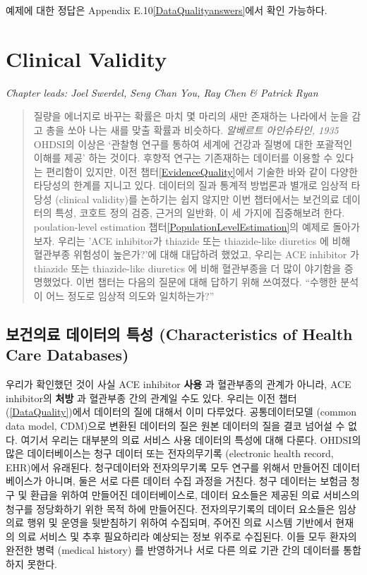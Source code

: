 \documentclass[11pt]{book}
\theoremstyle{definition}
\theoremstyle{definition}
\theoremstyle{definition}
\theoremstyle{remark}
\begin{document}
예제에 대한 정답은 Appendix E.10\ref{DataQualityanswers}에서 확인
가능하다.

\chapter{Clinical Validity}\label{ClinicalValidity}

\emph{Chapter leads: Joel Swerdel, Seng Chan You, Ray Chen \& Patrick
Ryan}

\begin{quote}
질량을 에너지로 바꾸는 확률은 마치 몇 마리의 새만 존재하는 나라에서 눈을
감고 총을 쏘아 나는 새를 맞출 확률과 비슷하다. \emph{알베르트
아인슈타인, 1935} OHDSI의 이상은 `관찰형 연구를 통하여 세계에 건강과
질병에 대한 포괄적인 이해를 제공' 하는 것이다. 후향적 연구는 기존재하는
데이터를 이용할 수 있다는 편리함이 있지만, 이전
챕터\ref{EvidenceQuality}에서 기술한 바와 같이 다양한 타당성의 한계를
지니고 있다. 데이터의 질과 통계적 방법론과 별개로 임상적 타당성
(clinical validity)를 논하기는 쉽지 않지만 이번 챕터에서는 보건의료
데이터의 특성, 코호트 정의 검증, 근거의 일반화, 이 세 가지에 집중해보려
한다. poulation-level estimation 챕터\ref{PopulationLevelEstimation}의
예제로 돌아가보자. 우리는 'ACE inhibitor가 thiazide 또는 thiazide-like
diuretics 에 비해 혈관부종 위험성이 높은가?'에 대해 대답하려 했었고,
우리는 ACE inhibitor 가 thiazide 또는 thiazide-like diuretics 에 비해
혈관부종을 더 많이 야기함을 증명했었다. 이번 챕터는 다음의 질문에 대해
답하기 위해 쓰여졌다. ``수행한 분석이 어느 정도로 임상적 의도와
일치하는가?'' 
\end{quote}

\section{보건의료 데이터의 특성 (Characteristics of Health Care
Databases)}\label{CharacteristicsOfDatabase}

우리가 확인했던 것이 사실 ACE inhibitor \textbf{사용} 과 혈관부종의
관계가 아니라, ACE inhibitor의 \textbf{처방} 과 혈관부종 간의 관계일
수도 있다. 우리는 이전 챕터(\ref{DataQuality})에서 데이터의 질에 대해서
이미 다루었다. 공통데이터모델 (common data model, CDM)으로 변환된
데이터의 질은 원본 데이터의 질을 결코 넘어설 수 없다. 여기서 우리는
대부분의 의료 서비스 사용 데이터의 특성에 대해 다룬다. OHDSI의 많은
데이터베이스는 청구 데이터 또는 전자의무기록 (electronic health record,
EHR)에서 유래된다. 청구데이터와 전자의무기록 모두 연구를 위해서 만들어진
데이터베이스가 아니며, 둘은 서로 다른 데이터 수집 과정을 거친다. 청구
데이터는 보험금 청구 및 환급을 위하여 만들어진 데이터베이스로, 데이터
요소들은 제공된 의료 서비스의 청구를 정당화하기 위한 목적 하에
만들어진다. 전자의무기록의 데이터 요소들은 임상 의료 행위 및 운영을
뒷받침하기 위하여 수집되며, 주어진 의료 시스템 기반에서 현재의 의료
서비스 및 추후 필요하리라 예상되는 정보 위주로 수집된다. 이들 모두
환자의 완전한 병력 (medical history) 를 반영하거나 서로 다른 의료 기관
간의 데이터를 통합하지 못한다.
\end{document}

